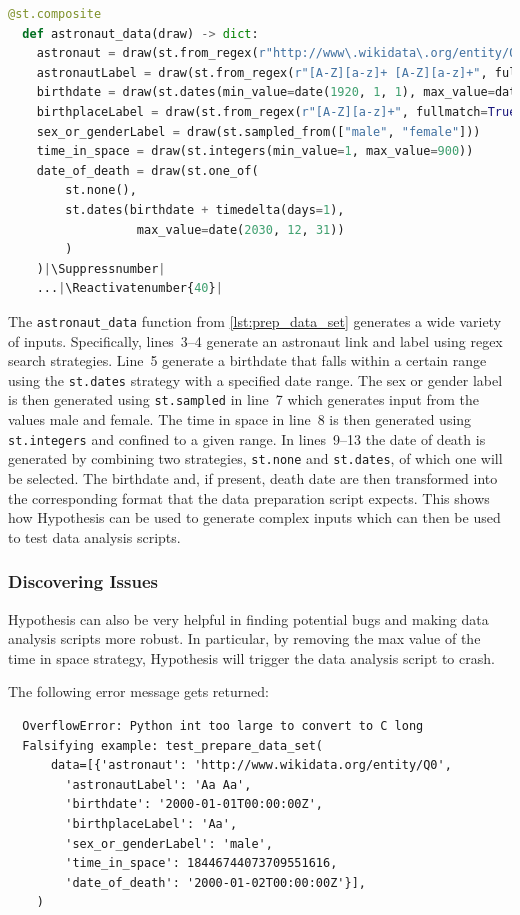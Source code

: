 \documentclass[runningheads]{llncs}
\makeatletter
\let\origthelstnumber\thelstnumber
\newcommand*\Suppressnumber{%
  \lst@AddToHook{OnNewLine}{%
    \let\thelstnumber\relax%
     \advance\c@lstnumber-\@ne\relax%
    }%
}
\newcommand*\Reactivatenumber[1]{%
  \setcounter{lstnumber}{\numexpr#1-1\relax}
  \lst@AddToHook{OnNewLine}{%
   \let\thelstnumber\origthelstnumber%
   \refstepcounter{lstnumber}%
  }%
}
\makeatother
\begin{document}
\begin{lstlisting}[language=Python,caption={Prepare Data Set from \texttt{data\_analysis.ipynb}},label=lst:prep_data_set]
  @st.composite
  def astronaut_data(draw) -> dict:
    astronaut = draw(st.from_regex(r"http://www\.wikidata\.org/entity/Q\d+", fullmatch=True))
    astronautLabel = draw(st.from_regex(r"[A-Z][a-z]+ [A-Z][a-z]+", fullmatch=True))
    birthdate = draw(st.dates(min_value=date(1920, 1, 1), max_value=date(2030, 12, 31)))
    birthplaceLabel = draw(st.from_regex(r"[A-Z][a-z]+", fullmatch=True))
    sex_or_genderLabel = draw(st.sampled_from(["male", "female"]))
    time_in_space = draw(st.integers(min_value=1, max_value=900)) 
    date_of_death = draw(st.one_of(
        st.none(), 
        st.dates(birthdate + timedelta(days=1), 
                  max_value=date(2030, 12, 31))
        )
    )|\Suppressnumber|
    ...|\Reactivatenumber{40}|

\end{lstlisting}
The \texttt{astronaut\_data} function from \ref{lst:prep_data_set} generates a wide variety of inputs. Specifically, lines~3--4 generate an astronaut link and label using regex search strategies. Line~5 generate a birthdate that falls within a certain range using the \texttt{st.dates} strategy with a specified date range. The sex or gender label is then generated using \texttt{st.sampled} in line~7 which generates input from the values male and female. The time in space in line~8 is then generated using \texttt{st.integers} and confined to a given range. In lines~9--13 the date of death is generated by combining two strategies, \texttt{st.none} and \texttt{st.dates}, of which one will be selected. The birthdate and, if present, death date are then transformed into the corresponding format that the data preparation script expects. This shows how Hypothesis can be used to generate complex inputs which can then be used to test data analysis scripts.

\subsubsection{Discovering Issues}
Hypothesis can also be very helpful in finding potential bugs and making data analysis scripts more robust. In particular, by removing the max value of the time in space strategy, Hypothesis will trigger the data analysis script to crash.

\vspace{5mm}
\noindent The following error message gets returned:
\begin{verbatim}
  OverflowError: Python int too large to convert to C long
  Falsifying example: test_prepare_data_set(
      data=[{'astronaut': 'http://www.wikidata.org/entity/Q0',
        'astronautLabel': 'Aa Aa',
        'birthdate': '2000-01-01T00:00:00Z',
        'birthplaceLabel': 'Aa',
        'sex_or_genderLabel': 'male',
        'time_in_space': 18446744073709551616,
        'date_of_death': '2000-01-02T00:00:00Z'}],
    )
\end{verbatim}
\end{document}
